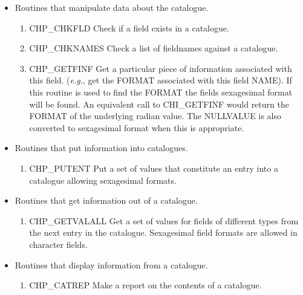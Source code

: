 \documentclass[11pt,nolof]{starlink}
\begin{document}
\begin{itemize}
\begin{enumerate}
 \end{enumerate}

\item Routines that manipulate data about the catalogue.

 \begin{enumerate}

  \item CHP\_CHKFLD Check if a field exists in a catalogue.

  \item CHP\_CHKNAMES Check a list of fieldnames against a catalogue.

\item CHP\_GETFINF Get a particular piece of information associated with this
field. (\emph{e.g.}, get the FORMAT associated with this field NAME). If this
routine is used to find the FORMAT the fields sexagesimal format will be found.
An equivalent call to CHI\_GETFINF would return the FORMAT of the underlying
radian value. The NULLVALUE is also converted to sexagesimal format when this
is appropriate.

 \end{enumerate}


\item Routines that put information into catalogues.

 \begin{enumerate}


  \item CHP\_PUTENT Put a set of values that constitute an entry into a
      catalogue allowing sexagesimal formats.

 \end{enumerate}

\item Routines that get information out of a catalogue.

 \begin{enumerate}

  \item  CHP\_GETVALALL Get a set of values for fields of different types
  from the next entry in the catalogue. Sexagesimal field formats
  are allowed in character fields.

 \end{enumerate}

\item Routines that display information from a catalogue.

 \begin{enumerate}

  \item  CHP\_CATREP Make a report on the contents of a catalogue.


\end{enumerate}
\end{itemize}
\end{document}
